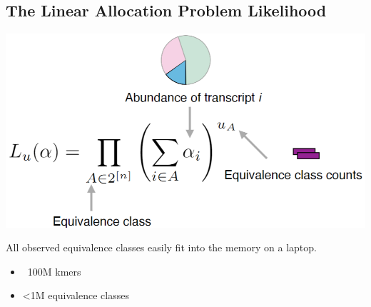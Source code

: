 \documentclass[10pt]{article}
\begin{document}
\subsection*{The Linear Allocation Problem Likelihood}
\begin{center}
    \includegraphics*[scale=0.75]{W4_3.png}
\end{center}
All observed equivalence classes easily fit into the memory on a laptop.
\begin{itemize}
    \item ~100M kmers
    \item <1M equivalence classes
\end{itemize}
\end{document}
